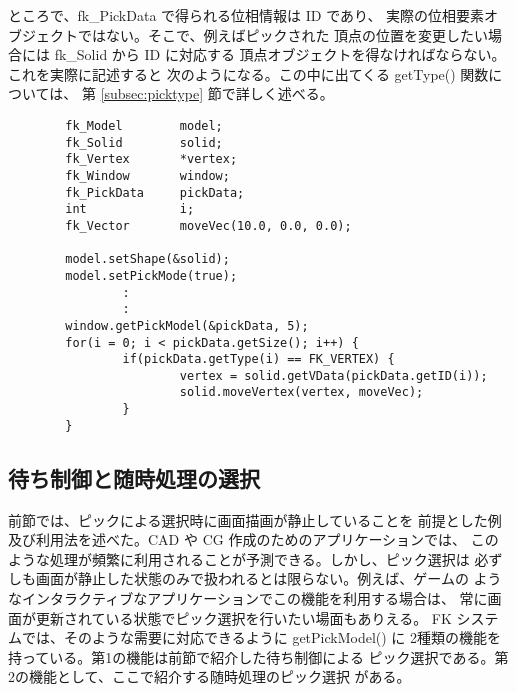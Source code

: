 ところで、fk\_PickData で得られる位相情報は ID であり、
実際の位相要素オブジェクトではない。そこで、例えばピックされた
頂点の位置を変更したい場合には fk\_Solid から ID に対応する
頂点オブジェクトを得なければならない。これを実際に記述すると
次のようになる。この中に出てくる getType() 関数については、
第 \ref{subsec:picktype} 節で詳しく述べる。
\\
\begin{breakbox}
\begin{verbatim}
        fk_Model        model;
        fk_Solid        solid;
        fk_Vertex       *vertex;
        fk_Window       window;
        fk_PickData     pickData;
        int             i;
        fk_Vector       moveVec(10.0, 0.0, 0.0);

        model.setShape(&solid);
        model.setPickMode(true);
                :
                :
        window.getPickModel(&pickData, 5);
        for(i = 0; i < pickData.getSize(); i++) {
                if(pickData.getType(i) == FK_VERTEX) {
                        vertex = solid.getVData(pickData.getID(i));
                        solid.moveVertex(vertex, moveVec);
                }
        }
\end{verbatim}
\end{breakbox}

\subsection{待ち制御と随時処理の選択}
前節では、ピックによる選択時に画面描画が静止していることを
前提とした例及び利用法を述べた。CAD や CG 作成のためのアプリケーションでは、
このような処理が頻繁に利用されることが予測できる。しかし、ピック選択は
必ずしも画面が静止した状態のみで扱われるとは限らない。例えば、ゲームの
ようなインタラクティブなアプリケーションでこの機能を利用する場合は、
常に画面が更新されている状態でピック選択を行いたい場面もありえる。
FK システムでは、そのような需要に対応できるように getPickModel() に
2種類の機能を持っている。第1の機能は前節で紹介した待ち制御による
ピック選択である。第2の機能として、ここで紹介する随時処理のピック選択
がある。

